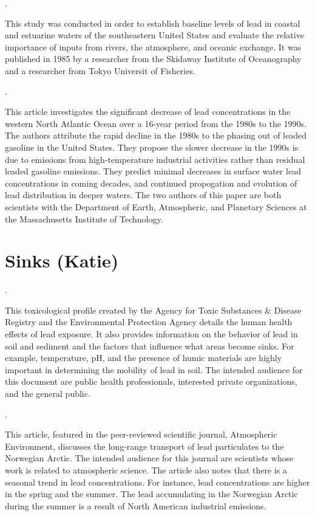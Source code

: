\documentclass{article}
\begin{document}
\medskip
\noindent {}.
\medskip

This study was conducted in order to establish baseline levels of lead in coastal and estuarine waters of the southeastern United States and evaluate the relative importance of inputs from rivers, the atmosphere, and oceanic exchange. It was published in 1985 by a researcher from the Skidaway Institute of Oceanography and a researcher from Tokyo Universit of Fisheries.

\medskip
\noindent {}.
\medskip

This article investigates the significant decrease of lead concentrations in the western North Atlantic Ocean over a 16-year period from the 1980s to the 1990s. The authors attribute the rapid decline in the 1980s to the phasing out of leaded gasoline in the United States. They propose the slower decrease in the 1990s is due to emissions from high-temperature industrial activities rather than residual leaded gasoline emissions. They predict minimal decreases in surface water lead concentrations in coming decades, and continued propogation and evolution of lead distribution in deeper waters. The two authors of this paper are both scientists with the Department of Earth, Atmospheric, and Planetary Sciences at the Massachusetts Institute of Technology.


\section{Sinks (Katie)}

\noindent {}.
\medskip

This toxicological profile created by the Agency for Toxic Substances \& Disease Registry and the Environmental Protection Agency details the human health effects of lead exposure. It also provides information on the behavior of lead in soil and sediment and the factors that influence what areas become sinks. For example, temperature, pH, and the presence of humic materials are highly important in determining the mobility of lead in soil. The intended audience for this document are public health professionals, interested private organizations, and the general public. 

\medskip

\noindent {}.

\medskip

This article, featured in the peer-reviewed scientific journal, Atmospheric Environment, discusses the long-range transport of lead particulates to the Norwegian Arctic. The intended audience for this journal are scientists whose work is related to atmospheric science. The article also notes that there is a seasonal trend in lead concentrations. For instance, lead concentrations are higher in the spring and the summer. The lead accumulating in the Norwegian Arctic during the summer is a result of North American industrial emissions. 
\medskip
\end{document}

